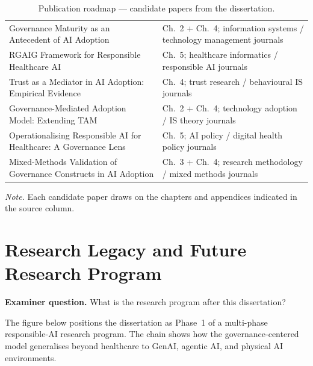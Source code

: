 {\tablestripes\tablefontsize
{}
\begin{xltabular}{\textwidth}{@{} >{\raggedright\arraybackslash}p{5.0cm} L @{}}
\caption[Publication roadmap]{Publication roadmap --- candidate papers from the dissertation.}\label{tab:dist_publication_roadmap} \\
\toprule
{} &  \\
\midrule
\endfirsthead
\endhead
\bottomrule
\endlastfoot
Governance Maturity as an Antecedent of AI Adoption & Ch.~2 + Ch.~4; information systems / technology management journals \\
\addlinespace
RGAIG Framework for Responsible Healthcare AI & Ch.~5; healthcare informatics / responsible AI journals \\
\addlinespace
Trust as a Mediator in AI Adoption: Empirical Evidence & Ch.~4; trust research / behavioural IS journals \\
\addlinespace
Governance-Mediated Adoption Model: Extending TAM & Ch.~2 + Ch.~4; technology adoption / IS theory journals \\
\addlinespace
Operationalising Responsible AI for Healthcare: A Governance Lens & Ch.~5; AI policy / digital health policy journals \\
\addlinespace
Mixed-Methods Validation of Governance Constructs in AI Adoption & Ch.~3 + Ch.~4; research methodology / mixed methods journals \\
\end{xltabular}}

\vspace{0.3em}\noindent\textit{Note.} Each candidate paper draws on the chapters and appendices indicated in the source column.


\section{Research Legacy and Future Research Program}
\label{app:distinction_research_legacy}

\noindent\textbf{Examiner question.} What is the research program after this dissertation?

\noindent The figure below positions the dissertation as Phase~1 of a multi-phase responsible-AI research program. The chain shows how the governance-centered model generalises beyond healthcare to GenAI, agentic AI, and physical AI environments.

